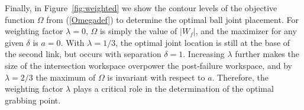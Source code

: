 \documentclass[12pt]{report}
\begin{document}
Finally, in Figure~\ref{fig:weighted} we show the contour levels of the  objective function $\Omega$ from (\ref{Omegadef}) to determine the optimal ball joint placement.  For weighting factor $\lambda = 0$, $\Omega$ is simply the value of $| W_f |$, and the maximizer for any given $\delta$ is $a = 0$.  With $\lambda  = 1/3$, the optimal joint location is still at the base of the second link, but occurs with separation $\delta = 1$.  Increasing $\lambda$ further makes the size of the intersection workspace overpower the post-failure workspace, and by $\lambda = 2/3$ the maximum of $\Omega$ is invariant with respect to $a$.  Therefore, the weighting factor $\lambda$ plays a critical role in the determination of the optimal grabbing point.

\vskip0.2cm
\end{document}
